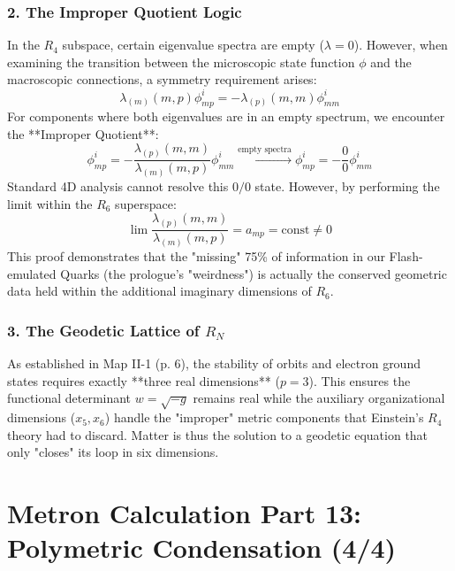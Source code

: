 \documentclass[11pt,a4paper,oneside]{article}
\begin{document}
\subsubsection*{2. The Improper Quotient Logic}
In the $R_4$ subspace, certain eigenvalue spectra are empty ($\lambda = 0$). However, when examining the transition between the microscopic state function $\phi$ and the macroscopic connections, a symmetry requirement arises:
\begin{equation}
    \lambda_{(m)}(m, p) \phi_{mp}^i = -\lambda_{(p)}(m, m) \phi_{mm}^i
\tag{II-1.3a}
\end{equation}
For components where both eigenvalues are in an empty spectrum, we encounter the **Improper Quotient**:
\begin{equation}
    \phi_{mp}^i = -\frac{\lambda_{(p)}(m, m)}{\lambda_{(m)}(m, p)} \phi_{mm}^i \xrightarrow{\text{empty spectra}} \phi_{mp}^i = -\frac{0}{0} \phi_{mm}^i
\end{equation}
Standard 4D analysis cannot resolve this $0/0$ state. However, by performing the limit within the $R_6$ superspace:
\begin{equation}
    \lim \frac{\lambda_{(p)}(m, m)}{\lambda_{(m)}(m, p)} = a_{mp} = \text{const} \neq 0
\tag{II-1.3b}
\end{equation}
This proof demonstrates that the "missing" 75\% of information in our Flash-emulated Quarks (the prologue's "weirdness") is actually the conserved geometric data held within the additional imaginary dimensions of $R_6$. 

\subsubsection*{3. The Geodetic Lattice of $R_N$}
As established in Map II-1 (p. 6), the stability of orbits and electron ground states requires exactly **three real dimensions** ($p=3$). This ensures the functional determinant $w = \sqrt{-g}$ remains real while the auxiliary organizational dimensions ($x_5, x_6$) handle the "improper" metric components that Einstein's $R_4$ theory had to discard. Matter is thus the solution to a geodetic equation that only "closes" its loop in six dimensions.
\section{Metron Calculation Part 13: Polymetric Condensation (4/4)}
\end{document}
